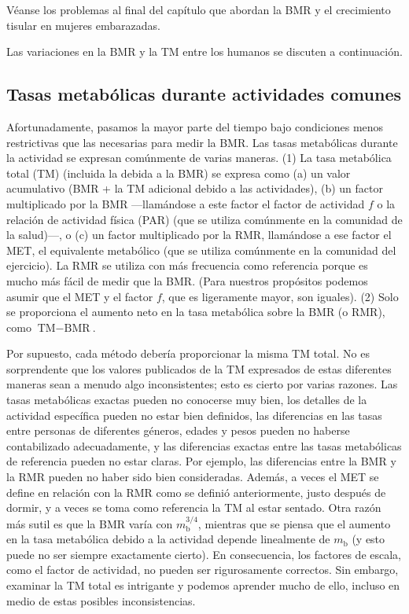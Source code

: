 \documentclass[12pt]{book}
\begin{document}
Véanse los problemas al final del capítulo que abordan la BMR y el crecimiento tisular en mujeres embarazadas.

Las variaciones en la BMR y la TM entre los humanos se discuten a continuación.

\subsection{Tasas metabólicas durante actividades comunes}

Afortunadamente, pasamos la mayor parte del tiempo bajo condiciones menos restrictivas que las necesarias para medir la BMR. Las tasas metabólicas durante la actividad se expresan comúnmente de varias maneras. (1) La tasa metabólica total (TM) (incluida la debida a la BMR) se expresa como (a) un valor acumulativo (BMR + la TM adicional debido a las actividades), (b) un factor multiplicado por la BMR ---llamándose a este factor el factor de actividad $f$ o la relación de actividad física (PAR) (que se utiliza comúnmente en la comunidad de la salud)---, o (c) un factor multiplicado por la RMR, llamándose a ese factor el MET, el equivalente metabólico (que se utiliza comúnmente en la comunidad del ejercicio). La RMR se utiliza con más frecuencia como referencia porque es mucho más fácil de medir que la BMR. (Para nuestros propósitos podemos asumir que el MET y el factor $f$, que es ligeramente mayor, son iguales). (2) Solo se proporciona el aumento neto en la tasa metabólica sobre la BMR (o RMR), como $\text{TM} - \text{BMR}$.

Por supuesto, cada método debería proporcionar la misma TM total. No es sorprendente que los valores publicados de la TM expresados de estas diferentes maneras sean a menudo algo inconsistentes; esto es cierto por varias razones. Las tasas metabólicas exactas pueden no conocerse muy bien, los detalles de la actividad específica pueden no estar bien definidos, las diferencias en las tasas entre personas de diferentes géneros, edades y pesos pueden no haberse contabilizado adecuadamente, y las diferencias exactas entre las tasas metabólicas de referencia pueden no estar claras. Por ejemplo, las diferencias entre la BMR y la RMR pueden no haber sido bien consideradas. Además, a veces el MET se define en relación con la RMR como se definió anteriormente, justo después de dormir, y a veces se toma como referencia la TM al estar sentado. Otra razón más sutil es que la BMR varía con $m_{\text{b}}^{3/4}$, mientras que se piensa que el aumento en la tasa metabólica debido a la actividad depende linealmente de $m_{\text{b}}$ (y esto puede no ser siempre exactamente cierto). En consecuencia, los factores de escala, como el factor de actividad, no pueden ser rigurosamente correctos. Sin embargo, examinar la TM total es intrigante y podemos aprender mucho de ello, incluso en medio de estas posibles inconsistencias.
\end{document}
